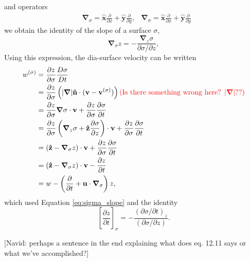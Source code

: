 and operators
\begin{align}
    &\boldsymbol{\nabla}_{\sigma}=\mathbf{\hat{x}}\frac{\partial}{\partial \bar{x}} + \mathbf{\hat{y}}\frac{\partial}{\partial \bar{y}}, &\boldsymbol{\nabla}_{\sigma}=\mathbf{\hat{x}}\frac{\partial}{\partial x} + \mathbf{\hat{y}}\frac{\partial}{\partial y}
\end{align}
we obtain the identity of the slope of a surface $\sigma$,
\begin{equation}\label{eq:sigma_slope}
    \boldsymbol{\nabla}_{\sigma}z = -\frac{\boldsymbol{\nabla}_{z} \sigma}{\partial \sigma / \partial z},
\end{equation}
Using this expression, the dia-surface velocity can be written
\begin{align}
    w^{(\dot{\sigma})}&= \frac{\partial z}{\partial \sigma} \frac{D \sigma}{D t} \nonumber \\
    &= \frac{\partial z}{\partial \sigma}\left( |\boldsymbol{\nabla}|\mathbf{\hat{n}}\cdot (\mathbf{v}-\mathbf{v}^{(\sigma)}) \right) \nonumber \textcolor{red}{\text{(Is there something wrong here? $|\boldsymbol{\nabla}|$??)}} \\
    &= \frac{\partial z}{\partial \sigma}\boldsymbol{\nabla} \sigma \cdot \mathbf{v} + \frac{\partial z}{\partial \sigma}\frac{\partial \sigma}{\partial t} \nonumber \\
    &= \frac{\partial z}{\partial \sigma}\left(\boldsymbol{\nabla}_{z}\sigma + \mathbf{\hat{z}}\frac{\partial \sigma}{\partial z} \right) \cdot \mathbf{v} + \frac{\partial z}{\partial \sigma}\frac{\partial \sigma}{\partial t} \nonumber \\
    &= \left( \mathbf{\hat{z}} - \boldsymbol{\nabla}_{\sigma}z \right) \cdot \mathbf{v} + \frac{\partial z}{\partial \sigma}\frac{\partial \sigma}{\partial t} \nonumber \\
    &= \left( \mathbf{\hat{z}} - \boldsymbol{\nabla}_{\sigma}z \right) \cdot \mathbf{v} - \frac{\partial z}{\partial t} \nonumber \\
    &= w - \left(\frac{\partial }{\partial t} + \mathbf{u}\cdot \boldsymbol{\nabla}_{\sigma} \right)z,
    \label{eq:dia_surface_velocity}
\end{align}
which used Equation \eqref{eq:sigma_slope} and the identity
\begin{equation}
    \left[\frac{\partial z}{\partial t} \right]_{\sigma} = -\frac{(\partial \sigma/\partial t)_{z}}{(\partial \sigma /\partial z)}.
\end{equation}

{\color{red}[Navid: perhaps a sentence in the end explaining what does eq. 12.11 says or what we've accomplished?]}

